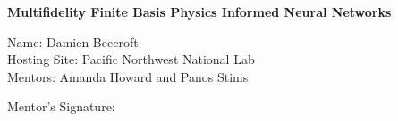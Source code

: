 \documentclass[12pt]{article}
\date{August 2022}
\begin{document}
\begin{titlepage}
    \begin{center}
        \vspace*{1cm}
            
        \Huge
        \textbf{Multifidelity Finite Basis Physics Informed Neural Networks}
            
            
        \vfill
            
        
        Name: Damien Beecroft\\
        Hosting Site: Pacific Northwest National Lab\\
        Mentors: Amanda Howard and Panos Stinis\\
        \vspace{2cm}
        \begin{flushleft}
       	Mentor's Signature:\\
       	\end{flushleft}
       	\Large
        
            
    \end{center}
\end{titlepage}
\end{document}

